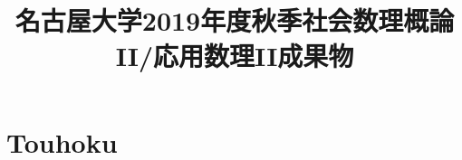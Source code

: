 \documentclass{jsarticle}
\title{名古屋大学2019年度秋季社会数理概論II/応用数理II成果物}
\author{}
\date{}
\numberwithin{equation}{answer}
\begin{document}
\maketitle


\section{Touhoku}

\end{document}
